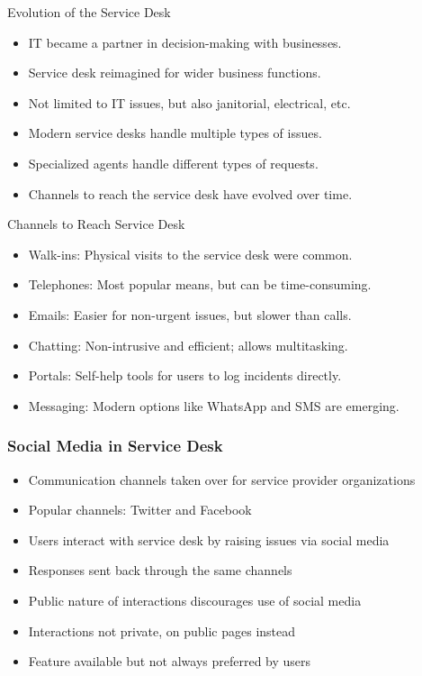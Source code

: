 \documentclass[aspectratio=169, table]{beamer}
\begin{document}
\begin{frame}{Evolution of the Service Desk}
	\begin{itemize}
		\item IT became a partner in decision-making with businesses.
		\item Service desk reimagined for wider business functions.
		\item Not limited to IT issues, but also janitorial, electrical, etc.
		\item Modern service desks handle multiple types of issues.
		\item Specialized agents handle different types of requests.
		\item Channels to reach the service desk have evolved over time.
	\end{itemize}
\end{frame}

\begin{frame}{Channels to Reach Service Desk}
	\begin{itemize}
		\item Walk-ins: Physical visits to the service desk were common.
		\item Telephones: Most popular means, but can be time-consuming.
		\item Emails: Easier for non-urgent issues, but slower than calls.
		\item Chatting: Non-intrusive and efficient; allows multitasking.
		\item Portals: Self-help tools for users to log incidents directly.
		\item Messaging: Modern options like WhatsApp and SMS are emerging.
	\end{itemize}
\end{frame}

\begin{frame}
	\frametitle{Social Media in Service Desk}
	\begin{itemize}
		\item Communication channels taken over for service provider organizations
		\item Popular channels: Twitter and Facebook
		\item Users interact with service desk by raising issues via social media
		\item Responses sent back through the same channels
		\item Public nature of interactions discourages use of social media
		\item Interactions not private, on public pages instead
		\item Feature available but not always preferred by users
	\end{itemize}
\end{frame}
\end{document}
